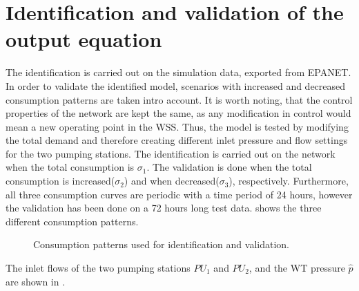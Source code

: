 \section{Identification and validation of the output equation}
\label{identification_and_validation_of_the_output_eq} 

The identification is carried out on the simulation data, exported from EPANET. In order to validate the identified model, scenarios with increased and decreased consumption patterns are taken intro account. It is worth noting, that the control properties of the network are kept the same, as any modification in control would mean a new operating point in the WSS. Thus, the model is tested by modifying the total demand and therefore creating different inlet pressure and flow settings for the two pumping stations. The identification is carried out on the network when the total consumption is $\sigma_1$. The validation is done when the total consumption is increased($\sigma_2$) and when decreased($\sigma_3$), respectively. Furthermore, all three consumption curves are periodic with a time period of 24 hours, however the validation has been done on a 72 hours long test data.  shows the three different consumption patterns.

 \begin{figure}[H]
 \centering
  
 \vspace{-2.5mm}
 \caption{Consumption patterns used for identification and validation.}
 \label{fig:sigma123}
 \end{figure}

 \vspace{-3mm}

 The inlet flows of the two pumping stations $PU_1$ and $PU_2$, and the WT pressure $\hat{p}$ are shown in . 

 \vspace{-3mm}

 \begin{figure}[H]
 \centering
  
 \vspace{-2.5mm}
 \label{fig:dk_sigma1}
 \end{figure}

